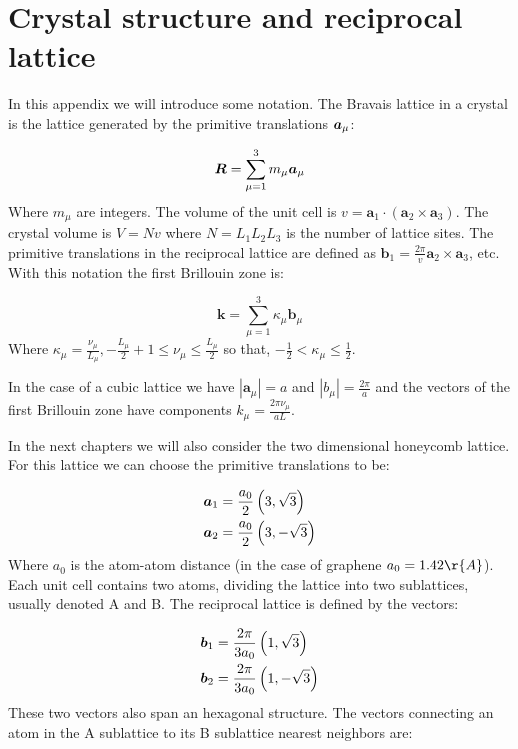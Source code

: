 \chapter{Crystal structure and reciprocal lattice}
\label{AP1A}

In this appendix we will introduce some notation. The Bravais lattice in a crystal is the lattice generated by the primitive translations $\boldsymbol{a}_\mu$:

\begin{equation}
\boldsymbol{R} = \sum_{\mu=1}^3 m_\mu \boldsymbol{a}_\mu
\end{equation}
Where $m_\mu$ are integers. The volume of the unit cell is $v = \textbf{a}_1 \cdot (\textbf{a}_2 \times \textbf{a}_3)$. The crystal volume is $V = Nv$ where $N = L_1 L_2 L_3$ is the number of lattice sites. The primitive translations in the reciprocal lattice are defined as $\textbf{b}_1 = \frac{2 \pi}{v}\textbf{a}_2 \times \textbf{a}_3$, etc. With this notation the first Brillouin zone is:

\begin{equation}
\textbf{k} = \sum_{\mu=1}^3 \kappa_\mu \textbf{b}_\mu
\end{equation}
Where $\kappa_\mu = \frac{\nu_\mu}{L_\mu}, -\frac{L_\mu}{2}+1 \leq \nu_\mu \leq \frac{L_\mu}{2}$ so that, $-\frac{1}{2} < \kappa_\mu \leq \frac{1}{2}$. 

In the case of a cubic lattice we have $|\textbf{a}_\mu| = a$ and $|b_\mu| = \frac{2\pi}{a}$ and the vectors of the first Brillouin zone have components $k_\mu = \frac{2 \pi \nu_\mu}{aL}$.

In the next chapters we will also consider the two dimensional honeycomb lattice. For this lattice we can choose the primitive translations to be:

\begin{align}
\boldsymbol{a}_1 &= \frac{a_0}{2} \left(3, \sqrt{3} \right) \\
\boldsymbol{a}_2 &= \frac{a_0}{2} \left(3, -\sqrt{3} \right)
\end{align}
Where $a_0$ is the atom-atom distance (in the case of graphene $a_0 = 1.42 \r{A}$). Each unit cell contains two atoms, dividing the lattice into two sublattices, usually denoted A and B. The reciprocal lattice is defined by the vectors:

\begin{align}
\boldsymbol{b}_1 &= \frac{2\pi}{3a_0} \left(1, \sqrt{3} \right) \\
\boldsymbol{b}_2 &= \frac{2\pi}{3a_0} \left(1, -\sqrt{3} \right)
\end{align}
These two vectors also span an hexagonal structure. The vectors connecting an atom in the A sublattice to its B sublattice nearest neighbors are:

